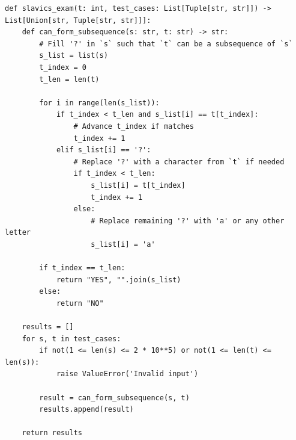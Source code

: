\documentclass[acmsmall,screen,nonacm]{acmart}
\begin{document}
{\scriptsize
\begin{tcolorbox}[mybox,breakable,title={Low-probability (0.07) correct solution}]
\begin{verbatim}
def slavics_exam(t: int, test_cases: List[Tuple[str, str]]) -> List[Union[str, Tuple[str, str]]]:
    def can_form_subsequence(s: str, t: str) -> str:
        # Fill '?' in `s` such that `t` can be a subsequence of `s`
        s_list = list(s)
        t_index = 0
        t_len = len(t)
        
        for i in range(len(s_list)):
            if t_index < t_len and s_list[i] == t[t_index]:
                # Advance t_index if matches
                t_index += 1
            elif s_list[i] == '?':
                # Replace '?' with a character from `t` if needed
                if t_index < t_len:
                    s_list[i] = t[t_index]
                    t_index += 1
                else:
                    # Replace remaining '?' with 'a' or any other letter
                    s_list[i] = 'a'
        
        if t_index == t_len:
            return "YES", "".join(s_list)
        else:
            return "NO"
    
    results = []
    for s, t in test_cases:
        if not(1 <= len(s) <= 2 * 10**5) or not(1 <= len(t) <= len(s)):
            raise ValueError('Invalid input')
        
        result = can_form_subsequence(s, t)
        results.append(result)
    
    return results
\end{verbatim}
\end{tcolorbox}
}
\end{document}
